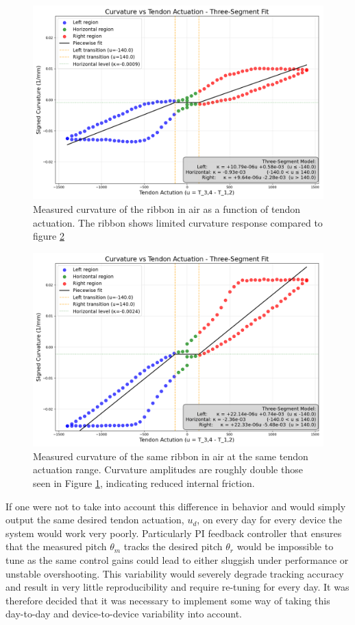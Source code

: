 \begin{figure}[H]
    \centering
    \includegraphics[width=0.9\linewidth]{images/ribbonadapter/Ribbonfit_2025-06-27_18-55-42-scaledaxis.png}
    \caption{Measured curvature of the ribbon in air as a function of tendon actuation. The ribbon shows limited curvature response compared to figure \ref{fig:bigamp}}
    \label{fig:scaledaxis}
\end{figure}

\begin{figure} [H]
    \centering
    \includegraphics[width=0.9\linewidth]{images/ribbonadapter/RibbonFit_2025-07-03_09-38-33.png}
    \caption{Measured curvature of the same ribbon in air at the same tendon actuation range. Curvature amplitudes are roughly double those seen in Figure \ref{fig:scaledaxis}, indicating reduced internal friction.}
    \label{fig:bigamp}
\end{figure}

If one were not to take into account this difference in behavior and would simply output the same desired tendon actuation, \(u_d\), on every day for every device the system would work very poorly. Particularly PI feedback controller that ensures that the measured pitch \(\theta_m\) tracks the desired pitch \(\theta_r\) would be impossible to tune as the same control gains could lead to either sluggish under performance or unstable overshooting. This variability would severely degrade tracking accuracy and result in very little reproducibility and require re-tuning for every day. It was therefore decided that it was necessary to implement some way of taking this day-to-day and device-to-device variability into account.

